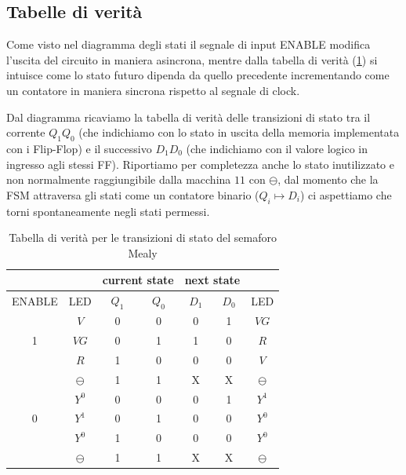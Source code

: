\documentclass[10pt, a4paper, italian]{article}
\begin{document}
\subsection{Tabelle di verità}
Come visto nel diagramma degli stati il segnale di input ENABLE modifica
l'uscita del circuito in maniera asincrona, mentre dalla tabella di verità
(\cref{tab: semftruth}) si intuisce come lo stato futuro dipenda da quello
precedente incrementando come un contatore in maniera sincrona rispetto al
segnale di clock.

Dal diagramma ricaviamo la tabella di verità delle transizioni di stato tra
il corrente $Q_1 Q_0$ (che indichiamo con lo stato in uscita della memoria
implementata con i Flip-Flop) e il successivo $D_1 D_0$ (che indichiamo con il
valore logico in ingresso agli stessi FF). Riportiamo per completezza anche lo
stato inutilizzato e non normalmente raggiungibile dalla macchina $11$ con
$\ominus$, dal momento che la FSM attraversa gli stati come un contatore
binario ($Q_i \mapsto D_i$) ci aspettiamo che torni spontaneamente negli stati
permessi.
\begin{table}[htbp]
    \centering
    \begin{tabular}{c|c|cc|cc|c}
    &\multicolumn{1}{c}{ }&\multicolumn{2}{c|}{current state} &
    \multicolumn{2}{c}{next state}\\
     \hline
         ENABLE& LED & $Q_1$ & $Q_0$ & $D_1$ & $D_0$ & LED \\
         \hline
       & $V$ & 0 & 0 & 0 & 1 & $VG$ \\
       1 & $VG$ & 0 & 1 & 1 & 0 & $R$ \\
       & $R$ & 1 & 0 & 0 & 0 & $V$ \\
        & $\ominus$ & 1 & 1 & X & X & $\ominus$\\
        \hline
        & $Y^0$ & 0 & 0 & 0 & 1 & $Y^1$ \\
        0 & $Y^1$ & 0 & 1 & 0 & 0 & $Y^0$ \\
         & $Y^0$ & 1 & 0 & 0 & 0& $Y^0$ \\
         &  $\ominus$ & 1 & 1 & X & X & $\ominus$ \\
    \end{tabular}
    \caption{Tabella di verità per le transizioni di stato del semaforo Mealy}
    \label{tab: semftruth}
\end{table}
\end{document}
